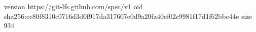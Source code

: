 version https://git-lfs.github.com/spec/v1
oid sha256:ee80f8310c0716d3d0f917da317607e0d9a20fa40ef02c9981f17d1f62bbe44e
size 934
